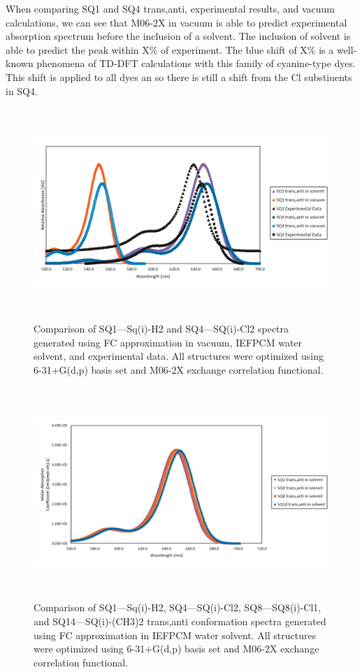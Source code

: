 \documentclass[journal=jacsat,manuscript=article]{achemso}
\begin{document}
{When comparing SQ1 and SQ4 trans,anti, experimental results, and vacuum calculations, we can see that M06-2X in vacuum is able to predict experimental absorption spectrum before the inclusion of a solvent. The inclusion of solvent is able to predict the peak within X$\%$ of experiment. The blue shift of X$\%$ is a well-known phenomena of TD-DFT calculations with this family of cyanine-type dyes. This shift is applied to all dyes an so there is still a shift from the Cl substiuents in SQ4.   
\begin{figure}[h]
    \centering
    \includegraphics[width=15cm,height=8cm]{figures/sq1-sq4.png}
    \caption{Comparison of  SQ1—Sq(i)-H2 and SQ4—SQ(i)-Cl2 spectra generated using FC approximation in vacuum, IEFPCM water solvent, and experimental data. All structures were optimized using 6-31+G(d,p) basis set and M06-2X exchange correlation functional.}
    \label{fig:SQ1 and SQ4}
\end{figure}
\newpage

\newpage
\newpage
\begin{figure}[h]
    \centering
    \includegraphics[width=15cm,height=8cm]{figures/sq1_4_8_14.png}
    \caption{Comparison of  SQ1—Sq(i)-H2, SQ4—SQ(i)-Cl2, SQ8—SQ8(i)-Cl1, and SQ14—SQ(i)-(CH3)2 trans,anti conformation spectra generated using FC approximation in IEFPCM water solvent. All structures were optimized  using 6-31+G(d,p) basis set and M06-2X exchange correlation functional.}
    \label{tab:SQ1,4,8,14 absorption}
\end{figure}

}
\end{document}
